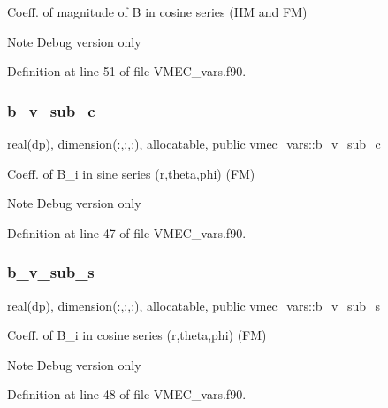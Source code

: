 Coeff. of magnitude of B in cosine series (HM and FM) 

\begin{DoxyNote}{Note}
Debug version only 
\end{DoxyNote}


Definition at line 51 of file V\+M\+E\+C\+\_\+vars.\+f90.

\mbox{\label{namespacevmec__vars_a2e07a2b5bd2384e16e8af8ca4f5b50d6}} 
\subsubsection{\texorpdfstring{b\+\_\+v\+\_\+sub\+\_\+c}{b\_v\_sub\_c}}
{\footnotesize\ttfamily real(dp), dimension(\+:,\+:,\+:), allocatable, public vmec\+\_\+vars\+::b\+\_\+v\+\_\+sub\+\_\+c}



Coeff. of B\+\_\+i in sine series (r,theta,phi) (FM) 

\begin{DoxyNote}{Note}
Debug version only 
\end{DoxyNote}


Definition at line 47 of file V\+M\+E\+C\+\_\+vars.\+f90.

\mbox{\label{namespacevmec__vars_aac5e249f0f14cf1e542f881d1777b730}} 
\subsubsection{\texorpdfstring{b\+\_\+v\+\_\+sub\+\_\+s}{b\_v\_sub\_s}}
{\footnotesize\ttfamily real(dp), dimension(\+:,\+:,\+:), allocatable, public vmec\+\_\+vars\+::b\+\_\+v\+\_\+sub\+\_\+s}



Coeff. of B\+\_\+i in cosine series (r,theta,phi) (FM) 

\begin{DoxyNote}{Note}
Debug version only 
\end{DoxyNote}


Definition at line 48 of file V\+M\+E\+C\+\_\+vars.\+f90.

